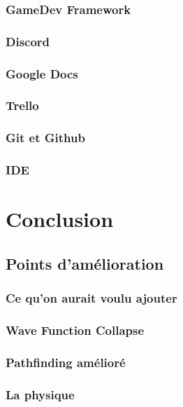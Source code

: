 \documentclass[10pt]{report}
\begin{document}
\subsubsection{GameDev Framework}
\subsubsection{Discord}
\subsubsection{Google Docs} %
\subsubsection{Trello}
\subsubsection{Git et Github}
\subsubsection{IDE}
\newpage

\section{Conclusion}
\subsection{Points d'amélioration}
\subsubsection{Ce qu'on aurait voulu ajouter}
\subsubsection{Wave Function Collapse}
\subsubsection{Pathfinding amélioré}
\subsubsection{La physique} %
\end{document}
